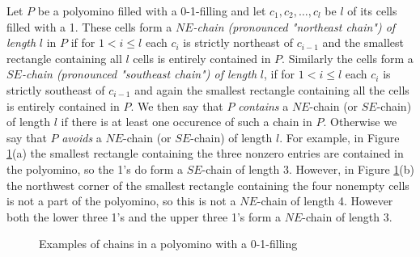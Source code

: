 Let $P$ be a polyomino filled with a 0-1-filling and let $c_1, c_2, \ldots, c_l$ be $l$ of its cells filled with a 1.
These cells form a $NE$\emph{-chain (pronounced "northeast chain") of length} $l$ in $P$ if for $1 < i \leq l$ each $c_i$ is 
strictly northeast of $c_{i-1}$ and the smallest rectangle containing all $l$
cells is entirely contained in $P$. Similarly the cells form a $SE$\emph{-chain (pronounced "southeast chain") of length} $l$, if
for $1 < i \leq l$ each $c_i$ is strictly southeast of $c_{i-1}$ and again the smallest rectangle containing all the cells is entirely
contained in $P$. We then say that $P$ \emph{contains} a $NE$-chain (or $SE$-chain) of length $l$ if there is at least one 
occurence of such a chain in $P$. Otherwise we say that $P$ \emph{avoids} a $NE$-chain (or $SE$-chain) of length $l$.
For example, in Figure \ref{figure_chains}(a) the smallest rectangle containing the three nonzero entries are contained in the 
polyomino, so the 1's do form a $SE$-chain of length 3. However, in Figure \ref{figure_chains}(b) the northwest corner
of the smallest rectangle containing the four nonempty cells is not a part of the polyomino, so this is not a $NE$-chain of length 4.
However both the lower three 1's and the upper three 1's form a $NE$-chain of length 3.

\begin{figure}
\centering
{}
\caption{Examples of chains in a polyomino with a 0-1-filling}
\label{figure_chains}
\end{figure}

